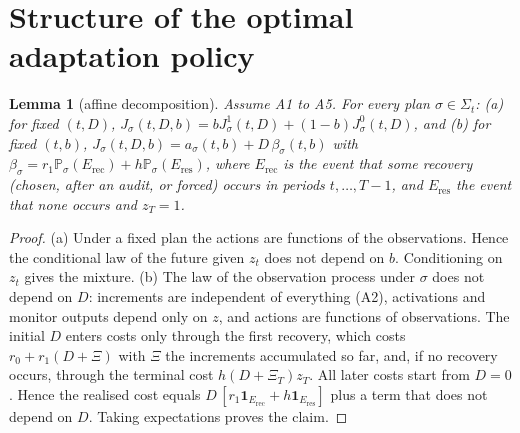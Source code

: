 \documentclass[11pt]{article}
\newtheorem{lemma}{Lemma}
\theoremstyle{definition}
\renewcommand{\P}{\mathbb{P}}
\begin{document}
\section{Structure of the optimal adaptation policy}

\begin{lemma}[affine decomposition]\label{lem:affine}
Assume A1 to A5. For every plan $\sigma\in\Sigma_t$:
(a) for fixed $(t,D)$, $J_\sigma(t,D,b)=bJ^1_\sigma(t,D)+(1-b)J^0_\sigma(t,D)$, and
(b) for fixed $(t,b)$, $J_\sigma(t,D,b)=a_\sigma(t,b)+D\,\beta_\sigma(t,b)$ with
$\beta_\sigma=r_1\P_\sigma(E_{\mathrm{rec}})+h\P_\sigma(E_{\mathrm{res}})$, where $E_{\mathrm{rec}}$ is the
event that some recovery (chosen, after an audit, or forced) occurs in periods $t,\dots,T-1$, and
$E_{\mathrm{res}}$ the event that none occurs and $z_T=1$.
\end{lemma}
\begin{proof}
(a) Under a fixed plan the actions are functions of the observations. Hence the conditional law of the future
given $z_t$ does not depend on $b$. Conditioning on $z_t$ gives the mixture.
(b) The law of the observation process under $\sigma$ does not depend on $D$: increments are independent of
everything (A2), activations and monitor outputs depend only on $z$, and actions are functions of
observations. The initial $D$ enters costs only through the first recovery, which costs $r_0+r_1(D+\Xi)$
with $\Xi$ the increments accumulated so far, and, if no recovery occurs, through the terminal cost
$h(D+\Xi_T)z_T$. All later costs start from $D=0$. Hence the realised cost equals
$D\,[r_1\mathbf{1}_{E_{\mathrm{rec}}}+h\mathbf{1}_{E_{\mathrm{res}}}]$ plus a term that does not depend on
$D$. Taking expectations proves the claim.
\end{proof}
\end{document}
